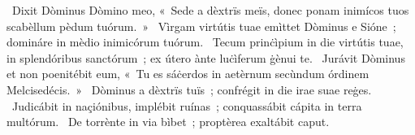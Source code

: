 \psalmChapterWithInscription{}
{ }
{%
~Dixit Dòminus Dòmino meo, «~Sede a dèxtrïs meïs, donec ponam inimícos tuos scabèllum pèdum tuórum.~»
~Vìrgam virtútis tuae emìttet Dòminus e Sióne~; domináre in mèdio inimicórum tuórum. 
~Tecum prinċìpium in die virtútis tuae, in splendóribus sanctórum~; ex útero ànte luċìferum ġènui te. 
~Jurávit Dòminus et non poenitébit eum, «~Tu es sáċerdos in aetèrnum secùndum órdinem Melcisedécis.~»
~Dòminus a dèxtrïs tuïs~; confrégit in die irae suae reġes. 
~Judicábit in naçiónibus, implébit ruínas~; conquassábit cápita in terra multórum. 
~De torrènte in via bìbet~; proptèrea exaltábit caput. 
}

